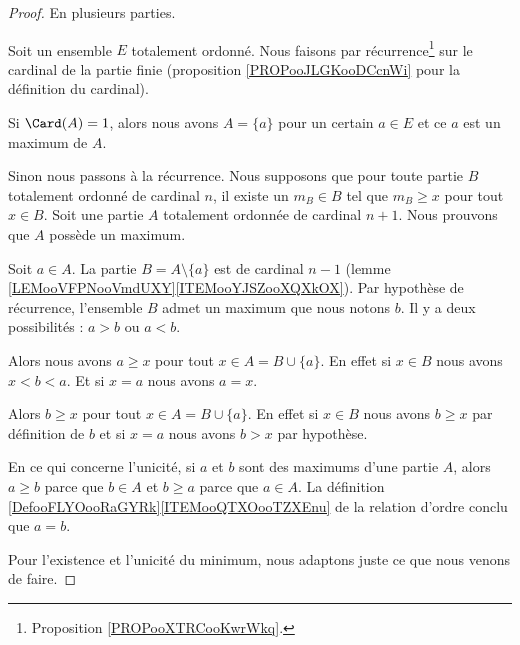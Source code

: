 \begin{proof}
	En plusieurs parties.
	\begin{subproof}
		Soit un ensemble \( E\) totalement ordonné. Nous faisons par récurrence\footnote{Proposition \ref{PROPooXTRCooKwrWkq}.} sur le cardinal de la partie finie (proposition \ref{PROPooJLGKooDCcnWi} pour la définition du cardinal).

		Si \( \Card(A)=1\), alors nous avons \( A=\{ a \}\) pour un certain \( a\in E\) et ce \( a\) est un maximum de \( A\).

		Sinon nous passons à la récurrence. Nous supposons que pour toute partie \( B\) totalement ordonné de cardinal \( n\), il existe un \( m_B\in B\) tel que \( m_B\geq x\) pour tout \( x\in B\). Soit une partie \( A\) totalement ordonnée de cardinal \( n+1\). Nous prouvons que \( A\) possède un maximum.

		Soit \( a\in A\). La partie \( B=A\setminus\{ a \}\) est de cardinal \( n-1\) (lemme \ref{LEMooVFPNooVmdUXY}\ref{ITEMooYJSZooXQXkOX}). Par hypothèse de récurrence, l'ensemble \( B\) admet un maximum que nous notons \( b\). Il y a deux possibilités : \( a>b\) ou \( a<b\).

		\begin{subproof}
			\spitem[Si \( a>b\)]
			Alors nous avons \( a\geq x\) pour tout \( x\in A=B\cup\{ a \}\). En effet si \( x\in B\) nous avons \( x<b<a\). Et si \( x=a\) nous avons \( a=x\).

			\spitem[Si \( b>a\)]
			Alors \( b\geq x\) pour tout \( x\in A=B\cup\{ a \}\). En effet si \( x\in B\) nous avons \( b\geq x\) par définition de \( b\) et si \( x=a\) nous avons \( b>x\) par hypothèse.
		\end{subproof}

		En ce qui concerne l'unicité, si \( a\) et \( b\) sont des maximums d'une partie \( A\), alors \( a\geq b\) parce que \( b\in A\) et \( b\geq a\) parce que \( a\in A\). La définition \ref{DefooFLYOooRaGYRk}\ref{ITEMooQTXOooTZXEnu} de la relation d'ordre conclu que \( a=b\).
	\end{subproof}
	Pour l'existence et l'unicité du minimum, nous adaptons juste ce que nous venons de faire.
\end{proof}



